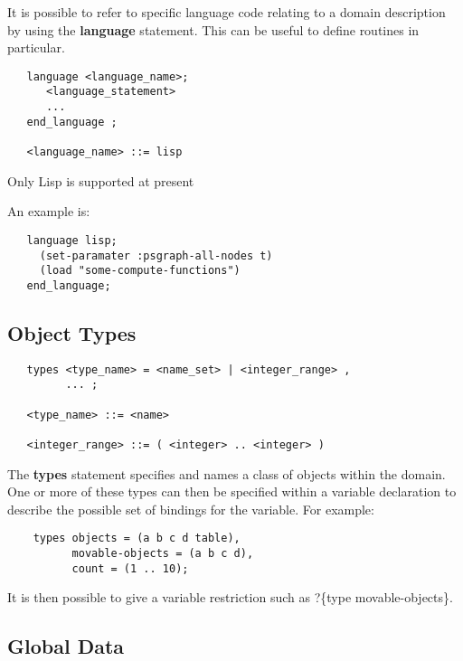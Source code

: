 It is possible to refer to specific language code relating to a domain
description by using the {\bf language} statement.  This can be useful to
define  routines in particular.

\begin{verbatim}
   language <language_name>;
      <language_statement>
      ...
   end_language ;

   <language_name> ::= lisp
\end{verbatim}

Only Lisp is supported at present

An example is:
\begin{verbatim}
   language lisp;
     (set-paramater :psgraph-all-nodes t)
     (load "some-compute-functions")
   end_language;
\end{verbatim}

\subsection{Object Types} 

\begin{verbatim}
   types <type_name> = <name_set> | <integer_range> ,
         ... ;

   <type_name> ::= <name>

   <integer_range> ::= ( <integer> .. <integer> )
\end{verbatim}

The {\bf types} statement specifies and names a class of
objects within the domain.  One or more of these types can then be
specified within a variable declaration to describe the possible set of
bindings for the variable.  For example:

\begin{verbatim} 
    types objects = (a b c d table),
          movable-objects = (a b c d),
          count = (1 .. 10);
\end{verbatim}

It is then possible to give a variable restriction such as ?\{type
movable-objects\}.

\subsection{Global Data} 

